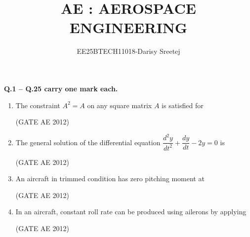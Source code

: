 \documentclass[journal,12pt,onecolumn]{IEEEtran}
\title{ AE : AEROSPACE ENGINEERING}
\author{EE25BTECH11018-Darisy Sreetej}
\theoremstyle{remark}
\begin{document}
\maketitle

\textbf{Q.1 -- Q.25 carry one mark each.}

\begin{enumerate}

\item The constraint $A^2 = A$ on any square matrix $A$ is satisfied for
\begin{enumerate}
\end{enumerate}
\hfill(GATE AE 2012)


\item The general solution of the differential equation  
$\dfrac{d^2y}{dt^2} + \dfrac{dy}{dt} - 2y = 0$ is
\begin{enumerate}
\end{enumerate}
\hfill(GATE AE 2012)



\item An aircraft in trimmed condition has zero pitching moment at
\begin{enumerate}
\end{enumerate}
\hfill(GATE AE 2012)



\item In an aircraft, constant roll rate can be produced using ailerons by applying
\begin{enumerate}
\end{enumerate}
\hfill(GATE AE 2012) 




\end{enumerate}
\end{document}
